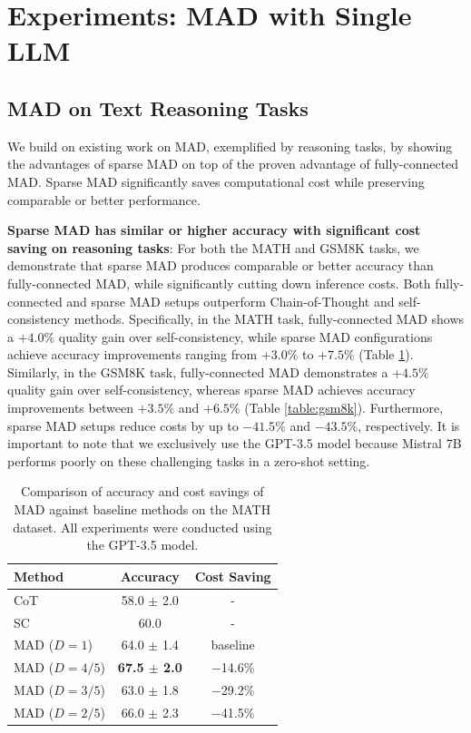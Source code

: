 \documentclass[11pt]{article}
\begin{document}
\section{Experiments: MAD with Single LLM}
\subsection{MAD on Text Reasoning Tasks}
We build on existing work on MAD, exemplified by reasoning tasks, by showing the advantages of sparse MAD on top of the proven advantage of fully-connected MAD. Sparse MAD significantly saves computational cost while preserving comparable or better performance.

\textbf{Sparse MAD has similar or higher accuracy with significant cost saving on reasoning tasks}: For both the MATH and GSM8K tasks, we demonstrate that sparse MAD produces comparable or better accuracy than fully-connected MAD, while significantly cutting down inference costs. Both fully-connected and sparse MAD setups outperform Chain-of-Thought and self-consistency methods. Specifically, in the MATH task, fully-connected MAD shows a $+4.0\%$ quality gain over self-consistency, while sparse MAD configurations achieve accuracy improvements ranging from $+3.0\%$ to $+7.5\%$ (Table \ref{table:math}). Similarly, in the GSM8K task, fully-connected MAD demonstrates a $+4.5\%$ quality gain over self-consistency, whereas sparse MAD achieves accuracy improvements between $+3.5\%$ and $+6.5\%$ (Table \ref{table:gsm8k}). Furthermore, sparse MAD setups reduce costs by up to $-41.5\%$ and $-43.5\%$, respectively. It is important to note that we exclusively use the GPT-3.5 model because Mistral 7B performs poorly on these challenging tasks in a zero-shot setting.

\begin{table}
  \centering
  \begin{tabular}{l|cc}
    \hline
    \textbf{Method} & Accuracy & Cost Saving \\
    \hline
    CoT & 58.0 $\pm$ 2.0 & - \\
    SC & 60.0 & - \\
    \hline
    MAD ($D=1$) & 64.0 $\pm$ 1.4 & baseline  \\
    MAD ($D=4/5$) & \textbf{67.5 $\pm$ 2.0} & $-$14.6\% \\
    MAD ($D=3/5$) & 63.0 $\pm$ 1.8 & $-$29.2\% \\
    MAD ($D=2/5$) & 66.0 $\pm$ 2.3 & $-$41.5\% \\
    \hline
  \end{tabular}
\caption{Comparison of accuracy and cost savings of MAD against baseline methods on the MATH dataset. All experiments were conducted using the GPT-3.5 model.}
\label{table:math}
\end{table}
\end{document}

